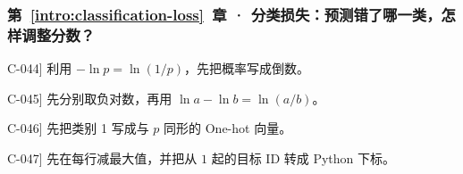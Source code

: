 \subsubsection*{第~\ref*{intro:classification-loss}~章 · 分类损失：预测错了哪一类，怎样调整分数？}
\begin{answerhints}
\item[\hyperref[exercise:single-token-cross-entropy]{C-044}] \leavevmode{}\label{hint:single-token-cross-entropy}利用 $-\ln p=\ln(1/p)$，先把概率写成倒数。
\item[\hyperref[exercise:probability-loss-ratio]{C-045}] \leavevmode{}\label{hint:probability-loss-ratio}先分别取负对数，再用 $\ln a-\ln b=\ln(a/b)$。
\item[\hyperref[exercise:softmax-logit-gradient]{C-046}] \leavevmode{}\label{hint:softmax-logit-gradient}先把类别 1 写成与 $p$ 同形的 One-hot 向量。
\item[\hyperref[exercise:one-hot-gradient-target]{C-047}] \leavevmode{}\label{hint:one-hot-gradient-target}先在每行减最大值，并把从 $1$ 起的目标 ID 转成 Python 下标。
\end{answerhints}
